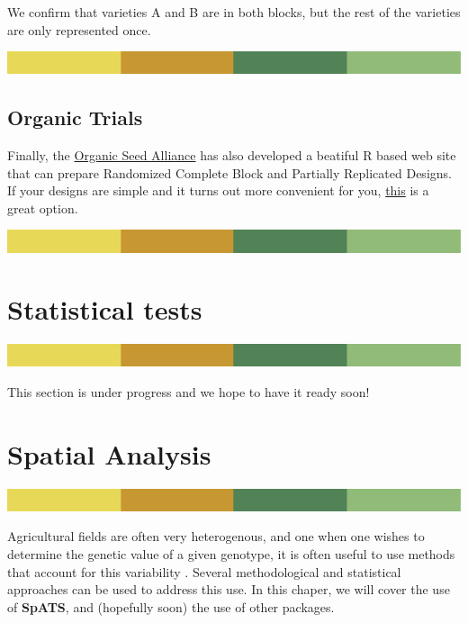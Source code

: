 \documentclass[
]{book}
\begin{document}
We confirm that varieties A and B are in both blocks, but the rest of the varieties are only represented once.

\includegraphics{rsrstrip.png}

\hypertarget{organic-trials}{%
\section{Organic Trials}\label{organic-trials}}

Finally, the \href{https://seedalliance.org/}{Organic Seed Alliance} has also developed a beatiful R based web site that can prepare Randomized Complete Block and Partially Replicated Designs. If your designs are simple and it turns out more convenient for you, \href{https://organicseed.shinyapps.io/OrganicTrials/}{this} is a great option.

\includegraphics{rsrstrip.png}

\hypertarget{statistical-tests}{%
\chapter{Statistical tests}\label{statistical-tests}}

\includegraphics{rsrstrip.png}

This section is under progress and we hope to have it ready soon!

\hypertarget{spatial-analysis}{%
\chapter{Spatial Analysis}\label{spatial-analysis}}

\includegraphics{rsrstrip.png}

Agricultural fields are often very heterogenous, and one when one wishes to determine the genetic value of a given genotype, it is often useful to use methods that account for this variability \citet{singh2003spatial}. Several methodological and statistical approaches can be used to address this use. In this chaper, we will cover the use of \textbf{SpATS}, and (hopefully soon) the use of other packages.
\end{document}
